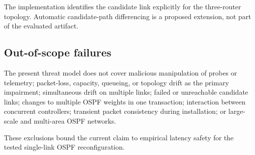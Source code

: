 The implementation identifies the candidate link explicitly for the three-router topology. Automatic candidate-path differencing is a proposed extension, not part of the evaluated artifact.

\subsection{Out-of-scope failures}

The present threat model does not cover malicious manipulation of probes or telemetry; packet-loss, capacity, queueing, or topology drift as the primary impairment; simultaneous drift on multiple links; failed or unreachable candidate links; changes to multiple OSPF weights in one transaction; interaction between concurrent controllers; transient packet consistency during installation; or large-scale and multi-area OSPF networks.

These exclusions bound the current claim to empirical latency safety for the tested single-link OSPF reconfiguration.
